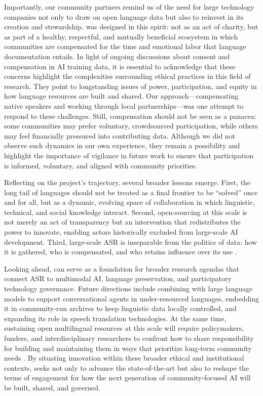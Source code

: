 \documentclass[]{fairmeta}
\begin{document}
Importantly, our community partners remind us of the need for large technology companies not only to draw on open language data but also to reinvest in its creation and stewardship. \OmniASR was designed in this spirit: not as an act of charity, but as part of a healthy, respectful, and mutually beneficial ecosystem in which communities are compensated for the time and emotional labor that language documentation entails. In light of ongoing discussions about consent and compensation in AI training data, it is essential to acknowledge that these concerns highlight the complexities surrounding ethical practices in this field of research. They point to longstanding issues of power, participation, and equity in how language resources are built and shared. Our approach—compensating native speakers and working through local partnerships—was one attempt to respond to these challenges. Still, compensation should not be seen as a panacea: some communities may prefer voluntary, crowdsourced participation, while others may feel financially pressured into contributing data. Although we did not observe such dynamics in our own experience, they remain a possibility and highlight the importance of vigilance in future work to ensure that participation is informed, voluntary, and aligned with community priorities.

Reflecting on the project’s trajectory, several broader lessons emerge. First, the long tail of languages should not be treated as a final frontier to be “solved” once and for all, but as a dynamic, evolving space of collaboration in which linguistic, technical, and social knowledge interact. Second, open-sourcing at this scale is not merely an act of transparency but an intervention that redistributes the power to innovate, enabling actors historically excluded from large-scale AI development. Third, large-scale ASR is inseparable from the politics of data: how it is gathered, who is compensated, and who retains influence over its use \citep{reitmaier2022opportunities}.

Looking ahead, \OmniASR can serve as a foundation for broader research agendas that connect ASR to multimodal AI, language preservation, and participatory technology governance. Future directions include combining \OmniASR with large language models to support conversational agents in under-resourced languages, embedding it in community-run archives to keep linguistic data locally controlled, and expanding its role in speech translation technologies. At the same time, sustaining open multilingual resources at this scale will require policymakers, funders, and interdisciplinary researchers to confront how to share responsibility for building and maintaining them in ways that prioritize long-term community needs \citep{wang2024human}. By situating innovation within these broader ethical and institutional contexts, \OmniASR seeks not only to advance the state-of-the-art but also to reshape the terms of engagement for how the next generation of community-focused AI will be built, shared, and governed.

\clearpage
\newpage



\clearpage
\newpage
\beginappendix

\end{document}
